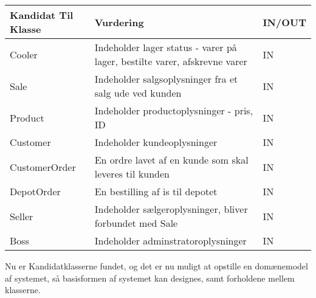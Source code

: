 \begin{longtable}{|p{120pt}|p{120pt}|p{120pt}|}\label{fig:Kandidatklasser}
    \textbf{Kandidat Til Klasse} & \textbf{Vurdering} & \textbf{IN/OUT} \\
    \hline
    \hline
    Cooler & Indeholder lager status - varer på lager, bestilte varer, afskrevne varer & IN \\
    \hline
    Sale & Indeholder salgsoplysninger fra et salg ude ved kunden & IN \\
    \hline
    Product & Indeholder productoplysninger - pris, ID & IN \\
    \hline
    Customer & Indeholder kundeoplysninger & IN \\
    \hline
    CustomerOrder & En ordre lavet af en kunde som skal leveres til kunden & IN \\
    \hline
    DepotOrder & En bestilling af is til depotet & IN \\
    \hline
    Seller & Indeholder sælgeroplysninger, bliver forbundet med Sale & IN \\
    \hline
    Boss & Indeholder adminstratoroplysninger & IN \\
    \hline
\end{longtable}
Nu er Kandidatklasserne fundet, og det er nu muligt at opstille en domænemodel af systemet, så basisformen af systemet kan designes, samt forholdene mellem klasserne.